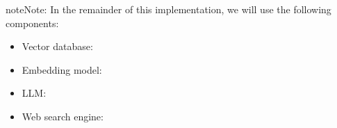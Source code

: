\documentclass[letterpaper,11pt,english]{sphinxmanual}
\begin{document}
\begin{figure}[htbp]
\centering

\noindent{}
\end{figure}

\begin{sphinxadmonition}{note}{Note:}
\sphinxAtStartPar
In the remainder of this implementation, we will use the following components:
\begin{itemize}
\item {} 
\sphinxAtStartPar
Vector database: 

\item {} 
\sphinxAtStartPar
Embedding model: 

\item {} 
\sphinxAtStartPar
LLM: 

\item {} 
\sphinxAtStartPar
Web search engine: 

\end{itemize}
\end{sphinxadmonition}
\end{document}
